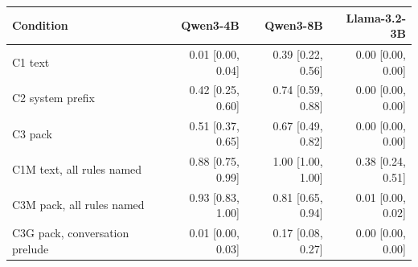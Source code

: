 \begin{tabular}{lrrr}
\toprule
Condition & Qwen3-4B & Qwen3-8B & Llama-3.2-3B \\
\midrule
C1 text & 0.01 [0.00, 0.04] & 0.39 [0.22, 0.56] & 0.00 [0.00, 0.00] \\
C2 system prefix & 0.42 [0.25, 0.60] & 0.74 [0.59, 0.88] & 0.00 [0.00, 0.00] \\
C3 pack & 0.51 [0.37, 0.65] & 0.67 [0.49, 0.82] & 0.00 [0.00, 0.00] \\
C1M text, all rules named & 0.88 [0.75, 0.99] & 1.00 [1.00, 1.00] & 0.38 [0.24, 0.51] \\
C3M pack, all rules named & 0.93 [0.83, 1.00] & 0.81 [0.65, 0.94] & 0.01 [0.00, 0.02] \\
C3G pack, conversation prelude & 0.01 [0.00, 0.03] & 0.17 [0.08, 0.27] & 0.00 [0.00, 0.00] \\
\bottomrule
\end{tabular}
